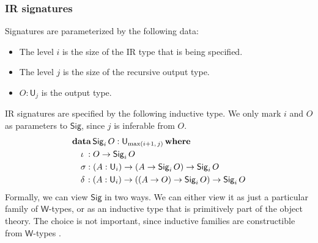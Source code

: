 \documentclass[acmsmall,screen,review,anonymous]{acmart}
\newcommand{\msf}[1]{{\mathsf{#1}}}
\newcommand{\mbf}[1]{{\mathbf{#1}}}
\newcommand{\data}{\mbf{data}}
\newcommand{\U}{\msf{U}}
\newcommand{\where}{\mbf{where}}
\newcommand{\Sig}{\msf{Sig}}
\begin{document}
\subsubsection{IR signatures}\label{sec:ir-signatures}
Signatures are parameterized by the following data:
\begin{itemize}
\item The level $i$ is the size of the IR type that is being specified.
\item The level $j$ is the size of the recursive output type.
\item $O : \U_j$ is the output type.
\end{itemize}
IR signatures are specified by the following inductive type. We only mark $i$ and $O$ as parameters to $\Sig$,
since $j$ is inferable from $O$.
\begin{alignat*}{4}
  &\data\, \Sig_i\,O : \U_{\max(i+1,\,j)}\,\where\\
  &\quad \iota\hspace{0.25em}  : O \to \Sig_i\,O \\
  &\quad \sigma               : (A : \U_i) \to (A \to \Sig_i\,O) \to \Sig_i\,O \\
  &\quad \delta\hspace{0.1em} : (A : \U_i) \to ((A \to O) \to \Sig_i\,O) \to \Sig_i\,O
\end{alignat*}
Formally, we can view $\Sig$ in two ways. We can either view it as just a particular family of $\msf{W}$-types,
or as an inductive type that is primitively part of the object theory. The choice is not important, since inductive
families are constructible from $\msf{W}$-types \cite{whynotw}.
\end{document}
